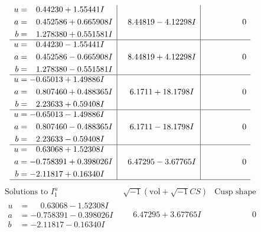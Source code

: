 \documentclass[1p]{elsarticle_modified}
\theoremstyle{definition}
\newcommand{\I}{\sqrt{-1}}
\begin{document}
$$\begin{array}{c|c|c}
\begin{aligned}
u &= \phantom{-}0.44230 + 1.55441 I \\
a &= \phantom{-}0.452586 + 0.665908 I \\
b &= \phantom{-}1.278380 + 0.551581 I\end{aligned}
 & \phantom{-}8.44819 - 4.12298 I & \phantom{-0.000000 } 0 \\ \hline\begin{aligned}
u &= \phantom{-}0.44230 - 1.55441 I \\
a &= \phantom{-}0.452586 - 0.665908 I \\
b &= \phantom{-}1.278380 - 0.551581 I\end{aligned}
 & \phantom{-}8.44819 + 4.12298 I & \phantom{-0.000000 } 0 \\ \hline\begin{aligned}
u &= -0.65013 + 1.49886 I \\
a &= \phantom{-}0.807460 + 0.488365 I \\
b &= \phantom{-}2.23633 + 0.59408 I\end{aligned}
 & \phantom{-}6.1711 + 18.1798 I & \phantom{-0.000000 } 0 \\ \hline\begin{aligned}
u &= -0.65013 - 1.49886 I \\
a &= \phantom{-}0.807460 - 0.488365 I \\
b &= \phantom{-}2.23633 - 0.59408 I\end{aligned}
 & \phantom{-}6.1711 - 18.1798 I & \phantom{-0.000000 } 0 \\ \hline\begin{aligned}
u &= \phantom{-}0.63068 + 1.52308 I \\
a &= -0.758391 + 0.398026 I \\
b &= -2.11817 + 0.16340 I\end{aligned}
 & \phantom{-}6.47295 - 3.67765 I & \phantom{-0.000000 } 0\\
 \hline 
 \end{array}$$\newpage$$\begin{array}{c|c|c}  
\text{Solutions to }I^u_{1}& \I (\text{vol} + \sqrt{-1}CS) & \text{Cusp shape}\\
 \hline 
\begin{aligned}
u &= \phantom{-}0.63068 - 1.52308 I \\
a &= -0.758391 - 0.398026 I \\
b &= -2.11817 - 0.16340 I\end{aligned}
 & \phantom{-}6.47295 + 3.67765 I & \phantom{-0.000000 } 0 \\ \hline\begin{aligned}

\end{aligned}
\end{array}$$
\end{document}
